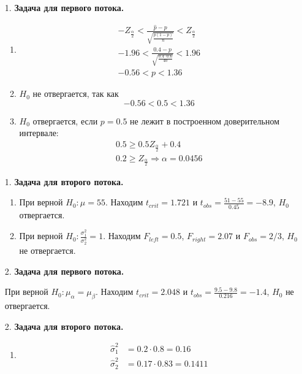 \begin{enumerate}

\item[1.] \textbf{Задача для первого потока.}

\begin{enumerate}
\item \begin{align*}
-Z_{\frac{\alpha}{2}}<\frac{\hat{p}-p}{\sqrt{\frac{\hat{p}(1-\hat{p})}{n}}}<Z_{\frac{\alpha}{2}} \\
-1.96<\frac{0.4-p}{\sqrt{\frac{0.4\cdot0.6}{40}}}<1.96 \\
-0.56<p<1.36
\end{align*}

\item $H_0$ не отвергается, так как
\[
-0.56<0.5<1.36
\]

\item $H_0$ отвергается, если $p=0.5$ не лежит в построенном доверительном интервале:
\begin{align*}
0.5\geq0.5Z_{\frac{\alpha}{2}}+0.4 \\
0.2\geq Z_{\frac{\alpha}{2}} \Rightarrow \alpha=0.0456
\end{align*}

\end{enumerate}

\item[1.] \textbf{Задача для второго потока.}
\begin{enumerate}
\item
При верной $H_0: \mu=55$.
Находим $t_{crit} = 1.721$ и $t_{obs} = \frac{51-55}{0.45}= -8.9$, $H_0$ отвергается.

\item
При верной $H_0: \frac{\sigma^2_1}{\sigma^2_2}=1$.
Находим $F_{left} = 0.5$, $F_{right}=2.07$ и $F_{obs} = 2/3$, $H_0$ не отвергается.
\end{enumerate}

\item[2.] \textbf{Задача для первого потока.}

При верной $H_0: \mu_{\alpha}=\mu_{\beta}$.
Находим $t_{crit} = 2.048$ и $t_{obs} =\frac{9.5-9.8}{0.216}= -1.4$, $H_0$ не отвергается.

\item[2.] \textbf{Задача для второго потока.}
\begin{enumerate}
\item
\begin{align*}
\hat{\sigma}^2_1 &= 0.2 \cdot 0.8 = 0.16 \\
\hat{\sigma}^2_2 &= 0.17 \cdot 0.83 = 0.1411
\end{align*}


\end{enumerate}
\end{enumerate}
